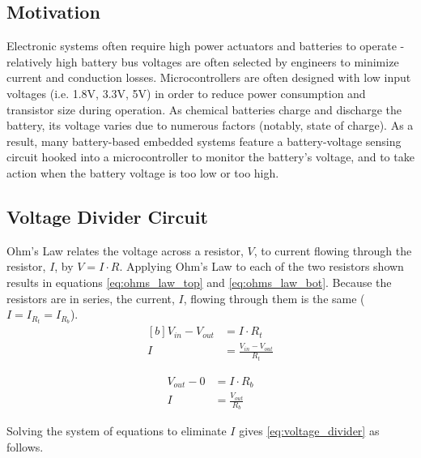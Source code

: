 \documentclass[main.tex]{subfiles}
\begin{document}
\subsection{Motivation}
Electronic systems often require high power actuators and batteries to operate - relatively high battery bus voltages are often selected by engineers to minimize current and conduction losses. Microcontrollers are often designed with low input voltages (i.e. 1.8V, 3.3V, 5V) in order to reduce power consumption and transistor size during operation. As chemical batteries charge and discharge the battery, its voltage varies due to numerous factors (notably, state of charge). As a result, many battery-based embedded systems feature a battery-voltage sensing circuit hooked into a microcontroller to monitor the battery's voltage, and to take action when the battery voltage is too low or too high.

\subsection{Voltage Divider Circuit}
Ohm's Law relates the voltage across a resistor, $V$, to current flowing through the resistor, $I$, by $V = I \cdot R$. Applying Ohm's Law to each of the two resistors shown results in equations \eqref{eq:ohms_law_top} and \eqref{eq:ohms_law_bot}. Because the resistors are in series, the current, $I$, flowing through them is the same ($I = I_{R_t} = I_{R_b}$).
\begin{equation}
    \begin{aligned}[b]
        V_{in} - V_{out} &= I \cdot R_t \\
        I &= \frac{V_{in} - V_{out}}{R_t}
    \end{aligned}
    \label{eq:ohms_law_top}
\end{equation}

\begin{equation}
    \begin{aligned}
        V_{out} - 0 &= I \cdot R_b \\
        I &= \frac{V_{out}}{R_b}
    \end{aligned}
    \label{eq:ohms_law_bot}
\end{equation}

\noindent Solving the system of equations to eliminate $I$ gives \eqref{eq:voltage_divider} as follows. 
\end{document}
